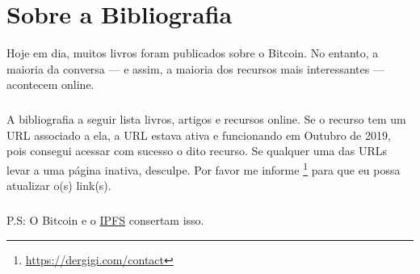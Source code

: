 \chapter*{Sobre a Bibliografia}

Hoje em dia, muitos livros foram publicados sobre o Bitcoin. No entanto, a maioria da conversa --- e assim, a maioria dos recursos mais interessantes --- acontecem online.

\paragraph{}
A bibliografia a seguir lista livros, artigos e recursos online. 
Se o recurso tem um URL associado a ela, a URL estava ativa e funcionando em Outubro de 2019, 
pois consegui acessar com sucesso o dito recurso. Se qualquer uma das URLs levar a uma página inativa, desculpe. Por favor me informe \footnote{\url{https://dergigi.com/contact}} para que eu possa atualizar o(s) link(s).

\paragraph{}
P.S: O Bitcoin e o \href{https://ipfs.io/}{IPFS} consertam isso.
